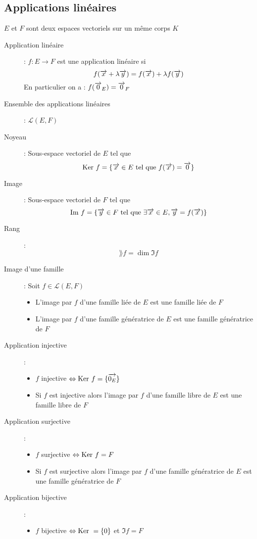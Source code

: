\subsection{Applications linéaires}
$E$ et $F$ sont deux espaces vectoriels sur un même corps $K$
\begin{description}
\item[Application linéaire] : $f:E\rightarrow F$ est une application linéaire si 
    \[ f(\overrightarrow{x}+\lambda\overrightarrow{y})=f(\overrightarrow{x})+\lambda f(\overrightarrow{y}) \]
    En particulier on a : $f(\overrightarrow{0}_E)=\overrightarrow{0}_F$
\item[Ensemble des applications linéaires] : $\mathcal L(E,F)$
\item[Noyeau] : Sous-espace vectoriel de $E$ tel que 
    \[ \textrm{Ker } f=\{\overrightarrow{x}\in E\textrm{ tel que } f(\overrightarrow{x})=\overrightarrow{0}\} \]
\item[Image] : Sous-espace vectoriel de $F$ tel que
    \[ \textrm{Im } f=\{\overrightarrow{y}\in F\textrm{ tel que }\exists\overrightarrow{x}\in E,\overrightarrow{y}=f(\overrightarrow{x})\} \]
\item[Rang] :
    \[ \rang f=\dim\Im f \]
\item[Image d'une famille] : Soit $f\in\mathcal L(E,F)$
\begin{itemize}
    \item L'image par $f$ d'une famille liée de $E$ est une famille liée de $F$
    \item L'image par $f$ d'une famille génératrice de $E$ est une famille génératrice de $F$
\end{itemize}
\item[Application injective] :
\begin{itemize}
    \item $f$ injective $\Leftrightarrow\textrm{Ker } f=\{\overrightarrow{0_E}\}$
    \item Si $f$ est injective alors l'image par $f$ d'une famille libre de $E$ est une famille libre de $F$
\end{itemize}
\item[Application surjective] :
\begin{itemize}
    \item $f$ surjective $\Leftrightarrow\textrm{Ker } f=F$
    \item Si $f$ est surjective alors l'image par $f$ d'une famille génératrice de $E$ est une famille génératrice de $F$
\end{itemize}
\item[Application bijective] :
\begin{itemize}
    \item $f$ bijective $\Leftrightarrow\textrm{Ker }=\{0\}$ et $\Im f=F$

\end{itemize}
\end{description}
